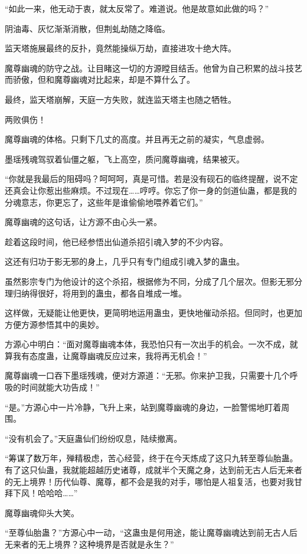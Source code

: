 \begin{this_body}
“如此一来，他无动于衷，就太反常了。难道说。他是故意如此做的吗？”

阴油毒、灰忆渐渐消散，但荆虬劫随之降临。

监天塔施展最终的反扑，竟然能操纵万劫，直接进攻十绝大阵。

魔尊幽魂的防守之战。让目睹这一切的方源瞠目结舌。他曾为自己积累的战斗技艺而骄傲，但和魔尊幽魂对比起来，却是不算什么了。

最终，监天塔崩解，天庭一方失败，就连监天塔主也随之牺牲。

两败俱伤！

魔尊幽魂的体格。只剩下几丈的高度。并且再无之前的凝实，气息虚弱。

墨瑶残魂驾驭着仙僵之躯，飞上高空，质问魔尊幽魂，结果被灭。

“你就是我最后的阻碍吗？呵呵呵，真是可惜。若是没有砚石的临终提醒，说不定还真会让你惹出些麻烦。不过现在……哼哼。你忘了你一身的剑道仙蛊，都是我的分魂意志，你更忘了，这些年是谁偷偷地喂养着它们。”

魔尊幽魂的这句话，让方源不由心头一紧。

趁着这段时间，他已经参悟出仙道杀招引魂入梦的不少内容。

这还有归功于影无邪的身上，几乎只有专门组成引魂入梦的蛊虫。

虽然影宗专门为他设计的这个杀招，根据修为不同，分成了几个层次。但影无邪分理归纳得很好，将用到的蛊虫，都各自堆成一堆。

这样做，无疑能让他更快，更简明地运用蛊虫，更快地催动杀招。但同时，也更加方便方源参悟其中的奥妙。

方源心中明白：“面对魔尊幽魂本体，我恐怕只有一次出手的机会。一次不成，就算我有态度蛊，让魔尊幽魂反应过来，我将再无机会！”

魔尊幽魂一口吞下墨瑶残魂，便对方源道：“无邪。你来护卫我，只需要十几个呼吸的时间就能大功告成！”

“是。”方源心中一片冷静，飞升上来，站到魔尊幽魂的身边，一脸警惕地盯着周围。

“没有机会了。”天庭蛊仙们纷纷叹息，陆续撤离。

“筹谋了数万年，殚精极虑，苦心经营，终于在今天炼成了这只九转至尊仙胎蛊。有了这只仙蛊，我就能超越历史诸尊，成就半个天魔之身，达到前无古人后无来者的无上境界！历代仙尊、魔尊，都不会是我的对手，哪怕是人祖复活，也要对我甘拜下风！哈哈哈……”

魔尊幽魂仰头大笑。

“至尊仙胎蛊？”方源心中一动，“这蛊虫是何用途，能让魔尊幽魂达到前无古人后无来者的无上境界？这种境界是否就是永生？”


\end{this_body}
